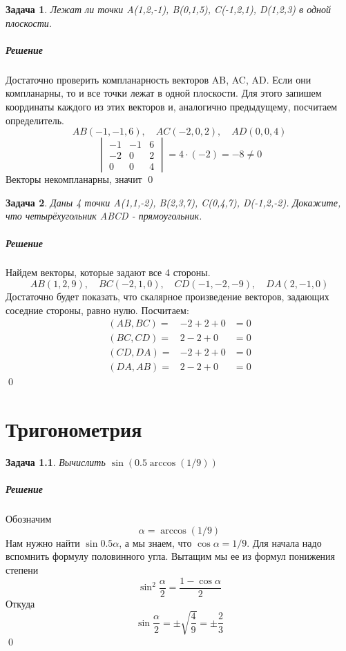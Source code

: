 \documentclass[a4paper,12pt]{report}
\newtheorem{problem}{Задача}[chapter]
\newenvironment{sol}{\paragraph{Решение}}{}
\begin{document}
	\begin{problem}
		Лежат ли точки A(1,2,-1), B(0,1,5), C(-1,2,1), D(1,2,3) в одной плоскости.
	\end{problem}
	\begin{sol}
		Достаточно проверить компланарность векторов AB, AC, AD. Если они компланарны, то и все точки лежат в одной плоскости. Для этого запишем координаты каждого из этих векторов и, аналогично предыдущему, посчитаем определитель.
		\[
		AB(-1,-1,6), \quad AC(-2,0,2), \quad AD(0,0,4)
		\]
		\begin{equation*}
			\begin{vmatrix}
				-1 & -1 & 6\\
				-2 & 0 & 2\\
				0 & 0 & 4
			\end{vmatrix}=4\cdot(-2)=-8 \neq 0
		\end{equation*}
		Векторы некомпланарны, значит 
		\qed
	\end{sol}
	\begin{problem}
		Даны 4 точки A(1,1,-2), B(2,3,7), C(0,4,7), D(-1,2,-2). Докажите, что четырёхугольник ABCD - прямоугольник.
	\end{problem}
	\begin{sol}
		Найдем векторы, которые задают все 4 стороны.
		\[
		AB(1,2,9), \quad BC(-2,1,0), \quad CD(-1,-2,-9),\quad DA(2,-1,0)
		\]
		Достаточно будет показать, что скалярное произведение векторов, задающих соседние стороны, равно нулю. Посчитаем:
		\begin{eqnarray*}
			(AB,BC)=&-2+2+0&=0\\
			(BC,CD)=&2-2+0&=0\\
			(CD,DA)=&-2+2+0&=0\\
			(DA,AB)=&2-2+0&=0
		\end{eqnarray*}
		\qed
	\end{sol}
	
	\chapter{Тригонометрия}
	\begin{problem}
		Вычислить $\sin{(0.5\arccos{(1/9)})}$
	\end{problem}
	\begin{sol}
		Обозначим
		\[
		\alpha = \arccos{(1/9)}
		\]
		Нам нужно найти $\sin{0.5\alpha}$, а мы знаем, что $\cos{\alpha}=1/9$. Для начала надо вспомнить формулу половинного угла. Вытащим мы ее из формул понижения степени
		\[
		\sin^2{\frac{\alpha}{2}}=\frac{1-\cos{\alpha}}{2}
		\]
		Откуда
		\[
		\sin{\frac{\alpha}{2}}=\pm \sqrt{\frac{4}{9}}=\pm\frac{2}{3}
		\]
		\qed
	\end{sol}
	
\end{document}
